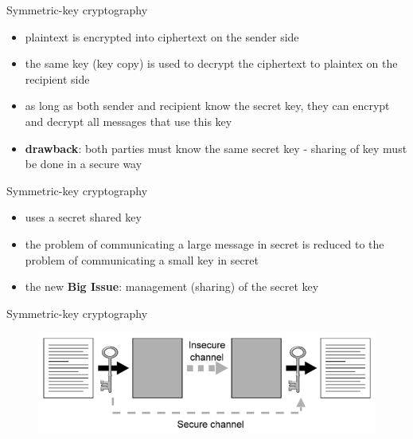 \documentclass[pdf]{beamer}
\begin{document}
\begin{frame}{Symmetric-key cryptography}
\begin{itemize}
\item
plaintext is encrypted into ciphertext on the sender side 

\item
the same key (key copy) is used to decrypt the ciphertext to plaintex on the recipient side

\item
as long as both sender and recipient know the secret key, they can encrypt and decrypt all messages that use this key

\item
\textbf{drawback}:  both parties must know the same secret key - sharing of key must be done in a secure way


\end{itemize}
\end{frame}



\begin{frame}{Symmetric-key cryptography}
\begin{itemize}
\item
uses a secret shared key

\item
the problem of communicating a large message in secret is reduced to the problem of communicating a small key in secret

\item
the new \textbf{Big Issue}: management (sharing) of the secret key

\end{itemize}
\end{frame}



\begin{frame}{Symmetric-key cryptography}
\begin{figure}[t]
\centering
\includegraphics[scale=0.5]{Images/sym}
\end{figure}
\end{frame}
\end{document}
